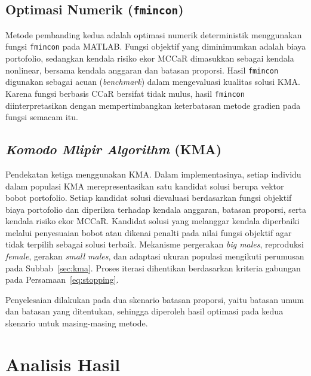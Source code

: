
    \subsection{Optimasi Numerik (\texttt{fmincon})}\label{sub:fmincon}
Metode pembanding kedua adalah optimasi numerik deterministik menggunakan fungsi \texttt{fmincon} pada MATLAB. Fungsi objektif yang diminimumkan adalah biaya
portofolio, sedangkan kendala risiko ekor MCCaR dimasukkan sebagai kendala nonlinear, bersama kendala anggaran dan batasan proporsi. Hasil \texttt{fmincon} digunakan sebagai acuan (\textit{benchmark}) dalam mengevaluasi kualitas solusi
KMA. Karena fungsi berbasis CCaR bersifat tidak mulus, hasil \texttt{fmincon} diinterpretasikan dengan mempertimbangkan keterbatasan metode gradien pada fungsi semacam itu.


    \subsection{\textit{Komodo Mlipir Algorithm} (KMA)}\label{sub:kma-impl}

    Pendekatan ketiga menggunakan KMA. Dalam implementasinya, setiap individu dalam populasi KMA merepresentasikan satu kandidat solusi berupa vektor bobot portofolio. Setiap kandidat solusi dievaluasi berdasarkan fungsi objektif biaya portofolio dan diperiksa terhadap kendala anggaran, batasan proporsi, serta kendala risiko ekor MCCaR. Kandidat solusi yang melanggar kendala diperbaiki melalui penyesuaian bobot atau dikenai penalti pada nilai fungsi objektif agar tidak terpilih sebagai solusi terbaik. Mekanisme pergerakan \textit{big males}, reproduksi \textit{female}, gerakan \textit{small males}, dan adaptasi ukuran populasi mengikuti perumusan pada Subbab~\ref{sec:kma}. Proses iterasi dihentikan berdasarkan kriteria gabungan pada Persamaan~\ref{eq:stopping}.
    
    Penyelesaian dilakukan pada dua skenario batasan proporsi, yaitu batasan umum dan batasan yang ditentukan, sehingga diperoleh hasil optimasi pada kedua
    skenario untuk masing-masing metode.


\section{Analisis Hasil}\label{sec:analisis-hasil}
    
